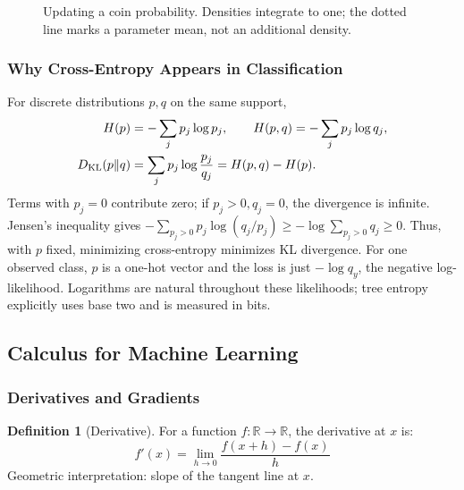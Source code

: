 \documentclass[11pt,twoside]{article}
\numberwithin{equation}{section}
\newcommand{\R}{\mathbb{R}}
\theoremstyle{plain}
\theoremstyle{definition}
\newtheorem{definition}[theorem]{Definition}
\theoremstyle{remark}
\begin{document}
\begin{figure}[H]
\centering
{}
\caption{Updating a coin probability. Densities integrate to one; the dotted line marks a parameter mean, not an additional density.}
\end{figure}

\subsubsection{Why Cross-Entropy Appears in Classification}
For discrete distributions $p,q$ on the same support,
\begin{align*}
H(p)&=-\sum_jp_j\log p_j,\qquad H(p,q)=-\sum_jp_j\log q_j,\\
D_{\rm KL}(p\|q)&=\sum_jp_j\log\frac{p_j}{q_j}=H(p,q)-H(p).
\end{align*}
Terms with $p_j=0$ contribute zero; if $p_j>0,q_j=0$, the divergence is infinite. Jensen's inequality gives $-\sum_{p_j>0}p_j\log(q_j/p_j)\ge-\log\sum_{p_j>0}q_j\ge0$. Thus, with $p$ fixed, minimizing cross-entropy minimizes KL divergence. For one observed class, $p$ is a one-hot vector and the loss is just $-\log q_y$, the negative log-likelihood. Logarithms are natural throughout these likelihoods; tree entropy explicitly uses base two and is measured in bits.

\subsection{Calculus for Machine Learning}

\subsubsection{Derivatives and Gradients}

\begin{definition}[Derivative]
For a function $f: \R \to \R$, the derivative at $x$ is:
\[
f'(x) = \lim_{h \to 0} \frac{f(x+h) - f(x)}{h}
\]
Geometric interpretation: slope of the tangent line at $x$.
\end{definition}
\end{document}
